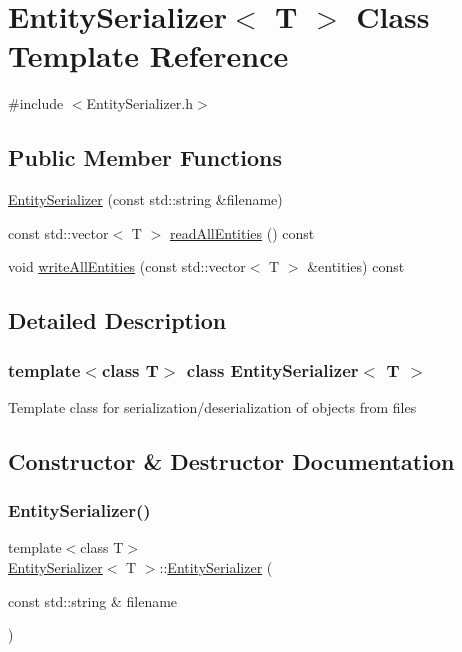 \hypertarget{classEntitySerializer}{}\section{Entity\+Serializer$<$ T $>$ Class Template Reference}
\label{classEntitySerializer}


{\ttfamily \#include $<$Entity\+Serializer.\+h$>$}

\subsection*{Public Member Functions}
\begin{DoxyCompactItemize}
\item 
\hyperlink{classEntitySerializer_aaccc5e208ba4931d413bc2d6ad83a97c}{Entity\+Serializer} (const std\+::string \&filename)
\item 
const std\+::vector$<$ T $>$ \hyperlink{classEntitySerializer_a4ca6b46341d27711980e48914efde897}{read\+All\+Entities} () const
\item 
void \hyperlink{classEntitySerializer_a763ccba2e88a71f6768a8d07866574b1}{write\+All\+Entities} (const std\+::vector$<$ T $>$ \&entities) const
\end{DoxyCompactItemize}


\subsection{Detailed Description}
\subsubsection*{template$<$class T$>$\newline
class Entity\+Serializer$<$ T $>$}

Template class for serialization/deserialization of objects from files 

\subsection{Constructor \& Destructor Documentation}
\mbox{\label{classEntitySerializer_aaccc5e208ba4931d413bc2d6ad83a97c}} 
\subsubsection{\texorpdfstring{Entity\+Serializer()}{EntitySerializer()}}
{\footnotesize\ttfamily template$<$class T$>$ \\
\hyperlink{classEntitySerializer}{Entity\+Serializer}$<$ T $>$\+::\hyperlink{classEntitySerializer}{Entity\+Serializer} (\begin{DoxyParamCaption}\item[{const std\+::string \&}]{filename }\end{DoxyParamCaption})\hspace{0.3cm}{\ttfamily [inline]}}


